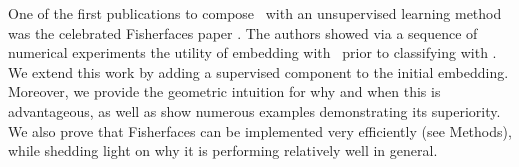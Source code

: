 \documentclass[10pt]{article}
\begin{document}


%
One of the first publications to compose \Fld~with an unsupervised learning method was the celebrated Fisherfaces paper \cite{Belhumeur1997a}.  The authors showed via a sequence of numerical experiments the utility of embedding with \Pca~prior to classifying with \Fld.  We extend this work by adding a supervised component to the initial embedding.  Moreover, we provide the geometric intuition for why and when this is advantageous, as well as show numerous examples demonstrating its superiority.  %
We also prove that Fisherfaces can be implemented very efficiently (see Methods), while shedding light on why it is performing relatively well in general.
\end{document}
